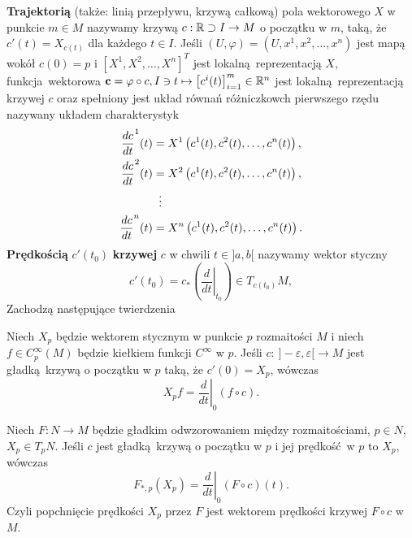 \textbf{Trajektorią} (także: linią przepływu, krzywą całkową) pola wektorowego \(X\) w punkcie \(m\in M\) nazywamy krzywą \(c: \mathbb{R} \supset I \rightarrow M\) o początku w \(m\), taką, że \(c'(t) = X_{c(t)}\) dla każdego \(t\in I\). Jeśli \((U, \varphi) = (U, x^1, x^2, \dots, x^n)\) jest mapą wokół \(c(0)=p\) i \([X^1, X^2, \dots, X^n]^T\) jest lokalną reprezentacją \(X\), funkcja wektorowa \(\mathbf{c} = \varphi \circ c, I \ni t \mapsto \left[c^i(t)\right]_{i=1}^m \in \mathbb{R}^n\) jest lokalną reprezentacją krzywej \(c\) oraz spełniony jest układ równań różniczkowch pierwszego rzędu nazywany układem charakterystyk
\begin{align*}
    \frac{dc}{dt}^1(t) &= X^1\left(c^1(t), c^2(t), \dots, c^n(t)\right),\\
    \frac{dc}{dt}^2(t) &= X^2\left(c^1(t), c^2(t), \dots, c^n(t)\right),\\
    &\mathrel{\makebox[\widthof{=}]{\vdots}}  \\
    \frac{dc}{dt}^n(t) &= X^n\left(c^1(t), c^2(t), \dots, c^n(t)\right).
\end{align*}
\textbf{Prędkością} \(c'(t_0)\) \textbf{krzywej} \(c\) w chwili \(t\in]a, b[\) nazywamy wektor styczny
\begin{equation}
c'(t_0) = c_\ast\left(\left.\frac{d}{dt}\right|_{t_0}\right)\in T_{c(t_0)}M,
\end{equation}
Zachodzą następujące twierdzenia
\begin{twierdzenie}[\cite{tu}, tw. 8.16]
Niech \(X_p\) będzie wektorem stycznym w punkcie \(p\) rozmaitości \(M\) i niech \(f\in C_p^\infty(M)\) będzie kiełkiem funkcji \(C^\infty\) w \(p\). Jeśli \(c:\:]-\varepsilon,\varepsilon[\rightarrow M\) jest gładką krzywą o początku w \(p\) taką, że \(c'(0)=X_p\), wówczas
\begin{equation}
X_pf=\left.\frac{d}{dt}\right|_0(f\circ c).
\end{equation}
\end{twierdzenie}
\begin{twierdzenie}[\cite{tu}, tw. 8.18]
Niech \(F: N\to M\) będzie gładkim odwzorowaniem między rozmaitościami, \(p\in N\), \(X_p\in T_p N\). Jeśli \(c\) jest gładką krzywą o początku w \(p\) i jej prędkość w \(p\) to \(X_p\), wówczas
\begin{equation}
F_{\ast, p} (X_p) = \left.\frac{d}{dt}\right|_0(F\circ c)(t).
\end{equation}
Czyli popchnięcie prędkości \(X_p\) przez \(F\) jest wektorem prędkości krzywej \(F\circ c\) w \(M\).
\end{twierdzenie}

